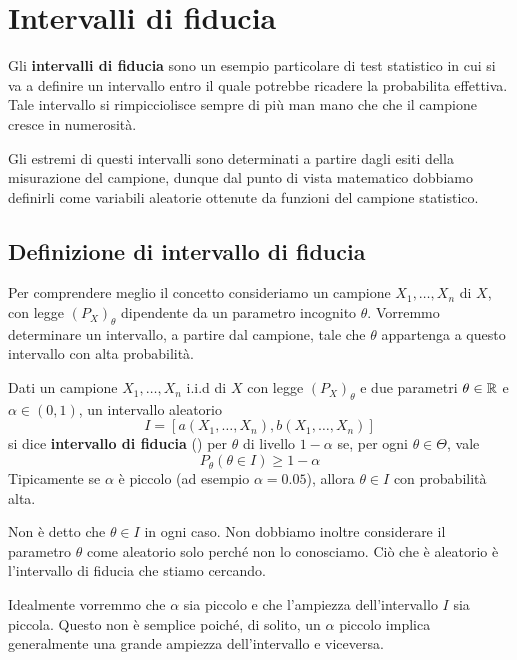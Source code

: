 \chapter{Intervalli di fiducia}
Gli \textbf{intervalli di fiducia} sono un esempio particolare di test statistico in cui si va a
definire un intervallo entro il quale potrebbe ricadere la probabilita effettiva. Tale intervallo
si rimpicciolisce sempre di più man mano che che il campione cresce in numerosità.

Gli estremi di questi intervalli sono determinati a partire dagli esiti della misurazione del
campione, dunque dal punto di vista matematico dobbiamo definirli come variabili aleatorie
ottenute da funzioni del campione statistico.

\section{Definizione di intervallo di fiducia}
Per comprendere meglio il concetto consideriamo un campione \iid $X_1, \dots, X_n$ di $X$, con
legge $(P_X)_\theta$ dipendente da un parametro incognito $\theta$. Vorremmo determinare un
intervallo, a partire dal campione, tale che $\theta$ appartenga a questo intervallo con alta
probabilità.

\begin{definition}
	Dati un campione $X_1, \dots, X_n$ i.i.d di $X$ con legge $(P_X)_\theta$ e due parametri
	$\theta \in \mathbb{R}$ e $\alpha \in (0,1)$, un intervallo aleatorio
	\[ I = [a(X_1, \dots, X_n), b(X_1, \dots, X_n)] \]
	si dice \textbf{intervallo di fiducia} (\IF) per $\theta$ di livello $1-\alpha$ se, per ogni
	$\theta \in \Theta$, vale
	\[ P_\theta (\theta \in I) \geq 1 - \alpha \]
	Tipicamente se $\alpha$ è piccolo (ad esempio $\alpha = 0.05$), allora $\theta \in I$ con
	probabilità alta.
\end{definition}

\begin{observation}
	Non è detto che $\theta \in I$ in ogni caso. Non dobbiamo inoltre considerare il parametro
	$\theta$ come aleatorio solo perché non lo conosciamo. Ciò che è aleatorio è l'intervallo di
	fiducia che stiamo cercando.
\end{observation}

Idealmente vorremmo che $\alpha$ sia piccolo e che l'ampiezza dell'intervallo $I$ sia piccola.
Questo non è semplice poiché, di solito, un $\alpha$ piccolo implica generalmente una grande
ampiezza dell'intervallo e viceversa.